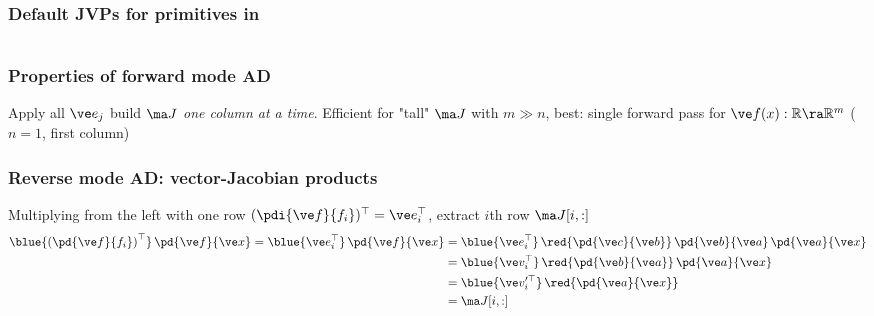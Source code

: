 \documentclass[fleqn,10pt]{beamer}
\begin{document}
\begin{frame}
    \frametitle{Default JVPs for \numpy primitives in \jax}
    \inputminted{python}{code/jax_lax_sin.py}
\end{frame}

\begin{frame}
    \frametitle{Properties of forward mode AD}
    Apply all $\ve e_j$ \ra build $\ma J$ \emph{one column at a time}.
    Efficient for "tall" $\ma J$ with $m\gg n$, best: single forward pass for $\ve f(x): \mathbb R \ra \mathbb R^m$ ($n=1$, first column)
    \edgecol
\end{frame}

\begin{frame}
    \frametitle{Reverse mode AD: vector-Jacobian products}
    Multiplying from the left with one row $(\pdi{\ve f}{f_i})^\top = \ve e_i^\top$, extract $i$th row $\ma J[i,:]$
    \begin{align*}
        \blue{\left(\pd{\ve f}{f_i}\right)^\top}\,\pd{\ve f}{\ve x} = \blue{\ve e_i^\top}\,\pd{\ve f}{\ve x}
            &= \blue{\ve e_i^\top}\,\red{\pd{\ve c}{\ve b}}\,\pd{\ve b}{\ve a}\,\pd{\ve a}{\ve x}\\
            &= \blue{\ve v_i^\top}\,\red{\pd{\ve b}{\ve a}}\,\pd{\ve a}{\ve x}\\
            &= \blue{\ve v_i'^\top}\,\red{\pd{\ve a}{\ve x}}\\
            &= \ma J[i,:]
    \end{align*}
\end{frame}
\end{document}
